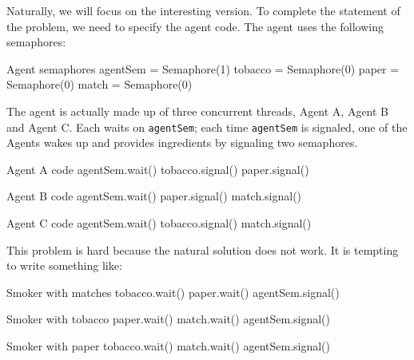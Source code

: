 Naturally, we will focus on the interesting version.  To complete
the statement of the problem, we need to specify the agent code.
The agent uses the following semaphores:

\begin{lstbox}{Agent semaphores}
agentSem = Semaphore(1)
tobacco = Semaphore(0)
paper = Semaphore(0)
match = Semaphore(0)
\end{lstbox}

The agent is actually made up of three concurrent
threads, Agent A, Agent B and Agent C.  Each waits on
{\tt agentSem}; each time {\tt agentSem} is signaled,
one of the Agents wakes up and provides ingredients by
signaling two semaphores.

\begin{lstbox}{Agent A code}
agentSem.wait()
tobacco.signal()
paper.signal()
\end{lstbox}

\begin{lstbox}{Agent B code}
agentSem.wait()
paper.signal()
match.signal()
\end{lstbox}

\begin{lstbox}{Agent C code}
agentSem.wait()
tobacco.signal()
match.signal()
\end{lstbox}

This problem is hard because the natural solution does not
work.  It is tempting to write something like:

\begin{lstbox}{Smoker with matches}
tobacco.wait()
paper.wait()
agentSem.signal()
\end{lstbox}

\begin{lstbox}{Smoker with tobacco}
paper.wait()
match.wait()
agentSem.signal()
\end{lstbox}

\begin{lstbox}{Smoker with paper}
tobacco.wait()
match.wait()
agentSem.signal()
\end{lstbox}


